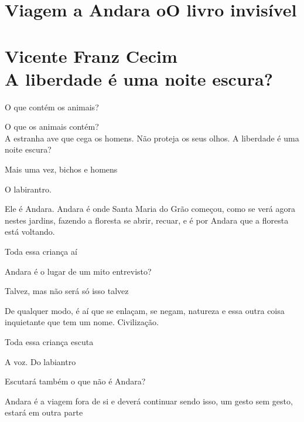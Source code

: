 \part*{Viagem a Andara oO livro invisível\\
\bigskip
\bigskip
\bigskip
\bigskip
{}\\
\Large{Vicente Franz Cecim}\\
\bigskip
\bigskip
\normalsize{A liberdade é uma noite escura?}}





\forceindent{}O que contém os animais?

O que os animais contém?\\

A estranha ave que cega os homens. Não proteja os seus olhos. A liberdade é uma noite escura?

Mais uma vez, bichos e homens

\breakk

\vspace*{4cm}

O labirantro.

Ele é Andara. Andara é onde Santa Maria do Grão começou, como se verá
agora nestes jardins, fazendo a floresta se abrir, recuar, e é por
Andara que a floresta está voltando.

Toda essa criança aí

Andara é o lugar de um mito entrevisto?

Talvez, mas não será só isso talvez

De qualquer modo, é aí que se enlaçam, se negam, natureza e essa outra
coisa inquietante que tem um nome. Civilização.

Toda essa criança escuta

A voz. Do labiantro

\breakk

\vspace*{4cm}

Escutará também o que não é Andara?

Andara é a viagem fora de si e deverá continuar sendo isso, um gesto sem
gesto, estará em outra parte

